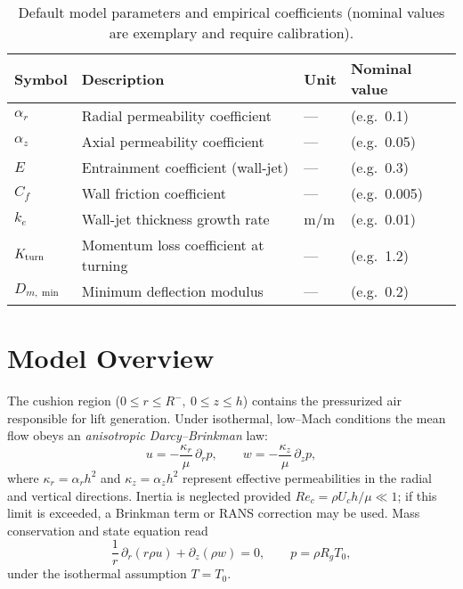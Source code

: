 \documentclass[11pt,a4paper]{article}
\begin{document}
\begin{table}[h]
  \centering
  \caption{Default model parameters and empirical coefficients (nominal values are exemplary and require calibration).}
  \label{tab:model-params}
  \begin{tabular}{@{}llll@{}}
    \toprule
    Symbol & Description & Unit & Nominal value \\
    \midrule
    $\alpha_r$     & Radial permeability coefficient      & —     & (e.g.\ 0.1) \\
    $\alpha_z$     & Axial permeability coefficient       & —     & (e.g.\ 0.05) \\
    $E$            & Entrainment coefficient (wall-jet)  & —     & (e.g.\ 0.3) \\
    $C_f$          & Wall friction coefficient           & —     & (e.g.\ 0.005) \\
    $k_e$          & Wall-jet thickness growth rate      & m/m   & (e.g.\ 0.01) \\
    $K_{\rm turn}$ & Momentum loss coefficient at turning& —     & (e.g.\ 1.2) \\
    $D_{m,\min}$   & Minimum deflection modulus         & —     & (e.g.\ 0.2) \\
    \bottomrule
  \end{tabular}
\end{table}


\section{Model Overview}
\label{sec:model-overview}

The cushion region ($0\le r\le R^{-},\ 0\le z\le h$) contains the pressurized air responsible for lift generation.
Under isothermal, low–Mach conditions the mean flow obeys an \emph{anisotropic Darcy–Brinkman} law:
\begin{equation}
  u = -\frac{\kappa_r}{\mu}\,\partial_r p , \qquad
  w = -\frac{\kappa_z}{\mu}\,\partial_z p ,
  \label{eq:darcy_brinkman}
\end{equation}
where $\kappa_r=\alpha_r h^2$ and $\kappa_z=\alpha_z h^2$ represent effective permeabilities in the radial and vertical directions.
Inertia is neglected provided $Re_c=\rho U_c h/\mu\ll1$; if this limit is exceeded, a Brinkman term or RANS correction may be used.
Mass conservation and state equation read
\begin{equation}
  \frac{1}{r}\,\partial_r\!\left(r\rho u\right)+\partial_z(\rho w)=0,
  \qquad
  p=\rho R_g T_0,
\end{equation}
under the isothermal assumption $T=T_0$.
\end{document}
